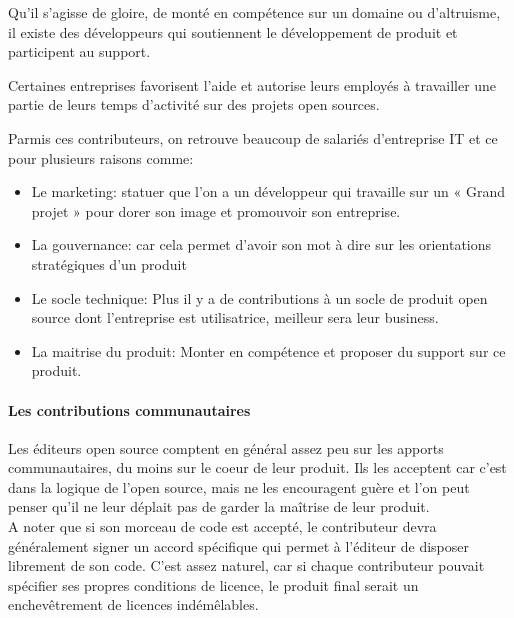 			\begin{description}[font=\color{burntorange}]

				\item[les développeurs indépendants: ] Qu'il s'agisse de gloire, de monté en compétence sur un domaine ou d'altruisme, il existe des développeurs qui soutiennent le développement de produit et participent au support.
				\item[Les contributeurs et entreprises contributrices: ] Certaines entreprises favorisent l'aide et autorise leurs employés à travailler une partie de leurs temps d'activité sur des projets open sources.

			\end{description}

			Parmis ces contributeurs, on retrouve beaucoup de salariés d'entreprise IT et ce pour plusieurs raisons comme:

			\begin{itemize}[label=\textbullet, font=\LARGE \color{burntorange}]
				\item Le marketing: statuer que l'on a un développeur qui travaille sur un « Grand projet » pour dorer son image et promouvoir son entreprise.
				\item La gouvernance: car cela permet d'avoir son mot à dire sur les orientations stratégiques d'un produit
				\item Le socle technique: Plus il y a de contributions à un socle de produit open source dont l'entreprise est utilisatrice, meilleur sera leur business.
				\item La maitrise du produit: Monter en compétence et proposer du support sur ce produit.
			\end{itemize}

			\paragraph{Les contributions communautaires\\}

			Les éditeurs open source comptent en général assez peu sur les apports communautaires, du moins sur le coeur de leur produit. Ils les acceptent car c'est dans la logique de l'open source, mais ne les encouragent guère et l'on peut penser qu'il ne leur déplait pas de garder la maîtrise de leur produit.\\

			A noter que si son morceau de code est accepté, le contributeur devra généralement signer un accord spécifique qui permet à l'éditeur de disposer librement de son code. C'est assez naturel, car si chaque contributeur pouvait spécifier ses propres conditions de licence, le produit final serait un enchevêtrement de licences indémêlables.\\

